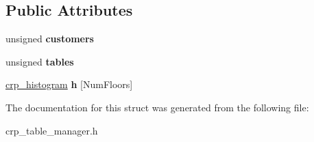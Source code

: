 \subsection*{Public Attributes}
\begin{DoxyCompactItemize}
\item 
\mbox{\label{structcpyp_1_1crp__table__manager_a9af9f62e043febc458621dd249e5b926}} 
unsigned {\bfseries customers}
\item 
\mbox{\label{structcpyp_1_1crp__table__manager_a8271a54c469336778e01c2f53f3ed632}} 
unsigned {\bfseries tables}
\item 
\mbox{\label{structcpyp_1_1crp__table__manager_afe17493f156cb27113e82af278da27ae}} 
\mbox{\hyperlink{structcpyp_1_1crp__histogram}{crp\+\_\+histogram}} {\bfseries h} \mbox{[}Num\+Floors\mbox{]}
\end{DoxyCompactItemize}


The documentation for this struct was generated from the following file\+:\begin{DoxyCompactItemize}
\item 
crp\+\_\+table\+\_\+manager.\+h\end{DoxyCompactItemize}
